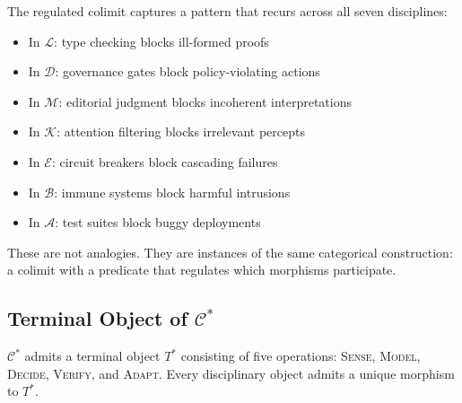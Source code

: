 \documentclass[11pt,a4paper]{article}
\begin{document}
The regulated colimit captures a pattern that recurs across all seven disciplines:
\begin{itemize}[nosep]
  \item In $\mathcal{L}$: type checking blocks ill-formed proofs
  \item In $\mathcal{D}$: governance gates block policy-violating actions
  \item In $\mathcal{M}$: editorial judgment blocks incoherent interpretations
  \item In $\mathcal{K}$: attention filtering blocks irrelevant percepts
  \item In $\mathcal{E}$: circuit breakers block cascading failures
  \item In $\mathcal{B}$: immune systems block harmful intrusions
  \item In $\mathcal{A}$: test suites block buggy deployments
\end{itemize}

These are not analogies. They are instances of the same categorical construction: a colimit with a predicate that regulates which morphisms participate.

\subsection{Terminal Object of $\mathcal{C}^*$}

\begin{theorem}
$\mathcal{C}^*$ admits a terminal object $T^*$ consisting of five operations: \textsc{Sense}, \textsc{Model}, \textsc{Decide}, \textsc{Verify}, and \textsc{Adapt}. Every disciplinary object admits a unique morphism to $T^*$.
\end{theorem}
\end{document}
